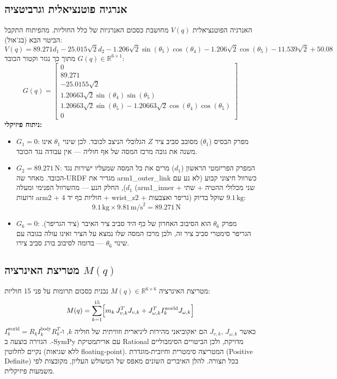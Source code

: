 \documentclass[11pt,a4paper]{article}
\begin{document}
\subsection{אנרגיה פוטנציאלית וגרביטציה}
האנרגיה הפוטנציאלית $V(q)$ מחושבת כסכום האנרגיות של כלל החוליות. מהפיתוח התקבל הביטוי הבא (בג'אול):
\begin{equation}
V(q) = 89.271 d_1 - 25.015\sqrt{2} d_2 - 1.206\sqrt{2}\sin(\theta_5)\cos(\theta_4) - 1.206\sqrt{2}\cos(\theta_5) - 11.539\sqrt{2} + 50.08
\end{equation}
מתוך כך נגזר וקטור הכובד $G(q) \in \mathbb{R}^{6 \times 1}$:
\begin{equation}
G(q) = \begin{bmatrix} 0 \\ 89.271 \\ -25.0155\sqrt{2} \\ 1.20663\sqrt{2}\sin(\theta_4)\sin(\theta_5) \\ 1.20663\sqrt{2}\sin(\theta_5) - 1.20663\sqrt{2}\cos(\theta_4)\cos(\theta_5) \\ 0 \end{bmatrix}
\end{equation}
\textbf{ניתוח פיזיקלי:}
\begin{itemize}
    \item $G_1 = 0$: מפרק הבסיס ($\theta_1$) מסובב סביב ציר $Z$ הגלובלי הניצב לכובד. לכן שינוי $\theta_1$ אינו משנה את גובה מרכז המסה של אף חוליה — אין עבודה נגד הכובד.
    \item $G_2 = 89.271\,\text{N}$: המפרק הפריזמטי הראשון ($d_1$) מרים את כל המסה שמעליו ישירות נגד הכובד. מאחר שה-URDF מגדיר את arm1\_outer\_link כשרוול חיצוני קבוע (לא נע עם $d_1$), החלק הנע — מהשרוול הפנימי ומעלה (arm1\_inner + שני מכלולי ההטיה + שתי זרועות arm2 + 4 חוליות כף יד + wrist\_z2 + גריפר ואצבעות) שוקל בדיוק $9.1\,\text{kg}$: \[ 9.1\,\text{kg} \times 9.81\,\text{m/s}^2 = 89.271\,\text{N} \]
    \item $G_6 = 0$: מפרק $\theta_6$ הוא הסיבוב האחרון של כף היד סביב ציר האיבר (ציר הגריפר). הגריפר סימטרי סביב ציר זה, ולכן מרכז המסה שלו נמצא על הציר ואינו עולה בגובה עם שינוי $\theta_6$ — בדומה לסיבוב בורג סביב צירו.
\end{itemize}

\subsection{מטריצת האינרציה $M(q)$}
מטריצת האינרציה $M(q) \in \mathbb{R}^{6\times6}$ נבנית כסכום תרומות על פני 15 חוליות:
\begin{equation}
M(q) = \sum_{k=1}^{15} \Bigl[ m_k\, J_{v,k}^T J_{v,k} + J_{\omega,k}^T I_k^{\text{world}} J_{\omega,k} \Bigr]
\end{equation}
כאשר $J_{v,k},\,J_{\omega,k}$ הם יאקוביאני מהירות ליניארית וזוויתית של חוליה $k$, ו-$I_k^{\text{world}}=R_k I_k^{\text{body}} R_k^T$. הגזירה בוצעה ב-\textenglish{SymPy} עם אריתמטיקת \textenglish{Rational} מדויקת, ולכן הביטויים הסימבוליים נקיים לחלוטין (ללא שגיאות \textenglish{floating-point}). המטריצה סימטרית וחיובית-מוגדרת (\textenglish{Positive Definite}) בכל תצורה. להלן האיברים השונים מאפס של המשולש העליון, מקובצות לפי משמעות פיזיקלית.
\end{document}
